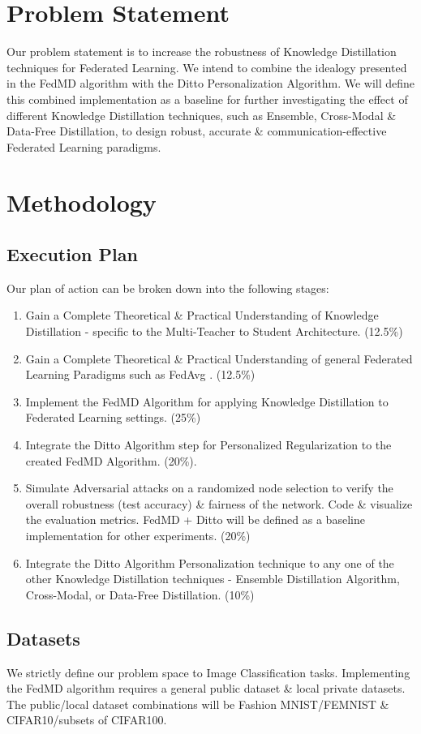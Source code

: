 \documentclass[conference]{IEEEtran}
\begin{document}
\section{Problem Statement}
Our problem statement is to increase the robustness of Knowledge Distillation techniques for Federated Learning. We intend to combine the idealogy presented in the FedMD algorithm with the Ditto Personalization Algorithm. We will define this combined implementation as a baseline for further investigating the effect of different Knowledge Distillation techniques, such as Ensemble, Cross-Modal \& Data-Free Distillation, to design robust, accurate \& communication-effective Federated Learning paradigms.   
\section{Methodology}
\subsection{Execution Plan}
Our plan of action can be broken down into the following stages:
\begin{enumerate}
\item Gain a Complete Theoretical \& Practical Understanding of Knowledge Distillation - specific to the Multi-Teacher to Student Architecture. (12.5\%)
\item Gain a Complete Theoretical \& Practical Understanding of general Federated Learning Paradigms such as FedAvg \cite{b7}. (12.5\%)
\item Implement the FedMD Algorithm for applying Knowledge Distillation to Federated Learning settings. (25\%)
\item Integrate the Ditto Algorithm step for Personalized Regularization to the created FedMD Algorithm. (20\%).
\item Simulate Adversarial attacks on a randomized node selection to verify the overall robustness (test accuracy) \& fairness of the network. Code \& visualize the evaluation metrics. FedMD + Ditto will be defined as a baseline implementation for other experiments. (20\%)
\item Integrate the Ditto Algorithm Personalization technique to any one of the other Knowledge Distillation techniques - Ensemble Distillation Algorithm, Cross-Modal, or Data-Free Distillation. (10\%)
\end{enumerate}

\subsection{Datasets}
We strictly define our problem space to Image Classification tasks. Implementing the FedMD algorithm requires a general public dataset \& local private datasets. The public/local dataset combinations will be Fashion MNIST/FEMNIST \& CIFAR10/subsets of CIFAR100. 
\end{document}
